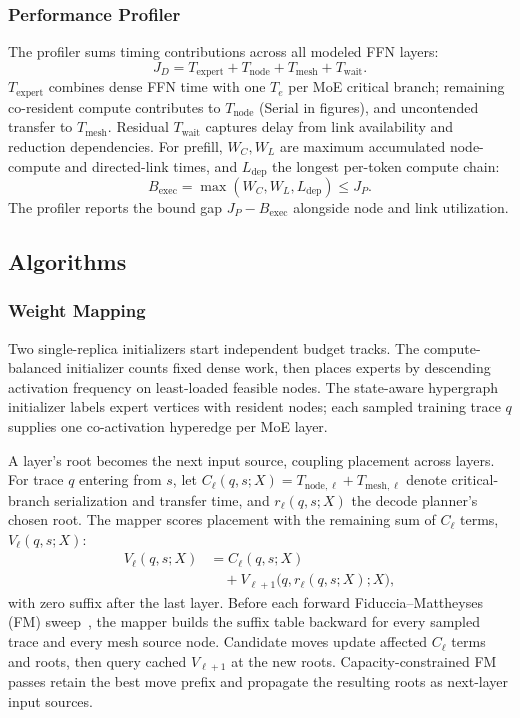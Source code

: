 \subsubsection{Performance Profiler}
The profiler sums timing contributions across all modeled FFN layers:
\begin{equation}
  J_D=T_{\mathrm{expert}}+T_{\mathrm{node}}+T_{\mathrm{mesh}}+T_{\mathrm{wait}}.
  \label{eq:decode-parts}
\end{equation}
$T_{\mathrm{expert}}$ combines dense FFN time with one $T_e$ per MoE critical branch; remaining co-resident compute contributes to $T_{\mathrm{node}}$ (Serial in figures), and uncontended transfer to $T_{\mathrm{mesh}}$. Residual $T_{\mathrm{wait}}$ captures delay from link availability and reduction dependencies. For prefill, $W_C,W_L$ are maximum accumulated node-compute and directed-link times, and $L_{\mathrm{dep}}$ the longest per-token compute chain:
\begin{equation}
  B_{\mathrm{exec}}=\max(W_C,W_L,L_{\mathrm{dep}})\leq J_P.
  \label{eq:prefill-bound}
\end{equation}
The profiler reports the bound gap $J_P-B_{\mathrm{exec}}$ alongside node and link utilization.

\subsection{Algorithms}

\subsubsection{Weight Mapping}
Two single-replica initializers start independent budget tracks. The compute-balanced initializer counts fixed dense work, then places experts by descending activation frequency on least-loaded feasible nodes. The state-aware hypergraph initializer labels expert vertices with resident nodes; each sampled training trace $q$ supplies one co-activation hyperedge per MoE layer.

A layer's root becomes the next input source, coupling placement across layers. For trace $q$ entering from $s$, let $C_\ell(q,s;X)=T_{\mathrm{node},\ell}+T_{\mathrm{mesh},\ell}$ denote critical-branch serialization and transfer time, and $r_\ell(q,s;X)$ the decode planner's chosen root. The mapper scores placement with the remaining sum of $C_\ell$ terms, $V_\ell(q,s;X)$:
\begin{equation}
  \begin{aligned}
    V_\ell(q,s;X)&=C_\ell(q,s;X)\\
      &\quad+V_{\ell+1}\big(q,r_\ell(q,s;X);X\big),
  \end{aligned}
  \label{eq:suffix}
\end{equation}
with zero suffix after the last layer. Before each forward Fiduccia--Mattheyses (FM) sweep~\cite{fm1982}, the mapper builds the suffix table backward for every sampled trace and every mesh source node. Candidate moves update affected $C_\ell$ terms and roots, then query cached $V_{\ell+1}$ at the new roots. Capacity-constrained FM passes retain the best move prefix and propagate the resulting roots as next-layer input sources.

